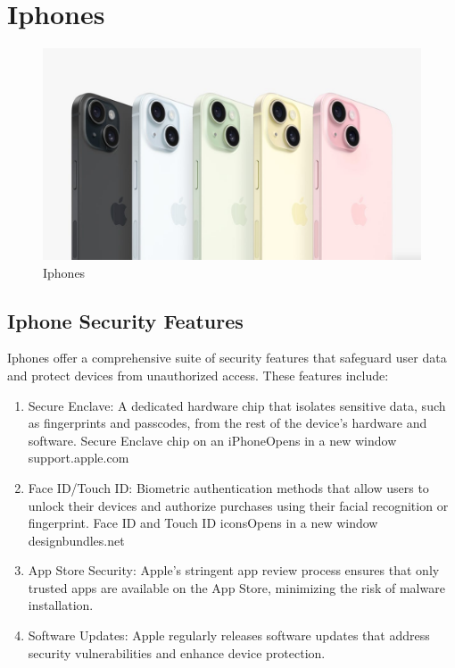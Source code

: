 \documentclass[11pt]{article}
\begin{document}
\section{Iphones}
\begin{figure}[H]
      \centering
      \includegraphics[width=.75\textwidth]{iphones/iphones_2.jpg}
      \caption{Iphones}
\end{figure}

\subsection{Iphone Security Features}

Iphones offer a comprehensive suite of security features that safeguard user
data and protect devices from unauthorized access. These features include:

\begin{enumerate}
      \item Secure Enclave: A dedicated hardware chip that isolates sensitive data, such as
            fingerprints and passcodes, from the rest of the device's hardware and
            software. Secure Enclave chip on an iPhoneOpens in a new window
            support.apple.com

      \item Face ID/Touch ID: Biometric authentication methods that allow users to unlock
            their devices and authorize purchases using their facial recognition or
            fingerprint. Face ID and Touch ID iconsOpens in a new window designbundles.net

      \item App Store Security: Apple's stringent app review process ensures that only
            trusted apps are available on the App Store, minimizing the risk of malware
            installation.

      \item Software Updates: Apple regularly releases software updates that address
            security vulnerabilities and enhance device protection.
\end{enumerate}
\end{document}
